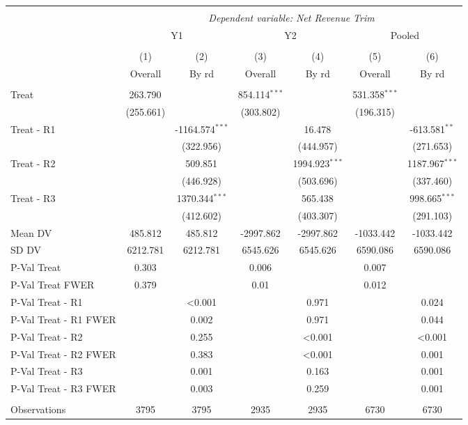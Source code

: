 \begin{tabular}{@{\extracolsep{5pt}}lcccccc}
\\[-1.8ex]\hline
\hline \\[-1.8ex]
& \multicolumn{6}{c}{\textit{Dependent variable: Net Revenue Trim}} \
\cr \cline{2-7}
\\[-1.8ex] & \multicolumn{2}{c}{Y1} & \multicolumn{2}{c}{Y2} & \multicolumn{2}{c}{Pooled}  \\
\\[-1.8ex] & (1) & (2) & (3) & (4) & (5) & (6) 
 \\ & Overall & By rd & Overall & By rd & Overall & By rd \\
\hline \\[-1.8ex]
 Treat & 263.790$^{}$ & & 854.114$^{***}$ & & 531.358$^{***}$ & \\
& (255.661) & & (303.802) & & (196.315) & \\
 Treat - R1 & & -1164.574$^{***}$ & & 16.478$^{}$ & & -613.581$^{**}$ \\
& & (322.956) & & (444.957) & & (271.653) \\
 Treat - R2 & & 509.851$^{}$ & & 1994.923$^{***}$ & & 1187.967$^{***}$ \\
& & (446.928) & & (503.696) & & (337.460) \\
 Treat - R3 & & 1370.344$^{***}$ & & 565.438$^{}$ & & 998.665$^{***}$ \\
& & (412.602) & & (403.307) & & (291.103) \\
 Mean DV & 485.812 & 485.812 & -2997.862 & -2997.862 & -1033.442 & -1033.442 \\
 SD DV & 6212.781 & 6212.781 & 6545.626 & 6545.626 & 6590.086 & 6590.086 \\
 P-Val Treat & 0.303 &  & 0.006 &  & 0.007 &  \\
 P-Val Treat FWER & 0.379 &  & 0.01 &  & 0.012 &  \\
 P-Val Treat - R1 &  & <0.001 &  & 0.971 &  & 0.024 \\
 P-Val Treat - R1 FWER &  & 0.002 &  & 0.971 &  & 0.044 \\
 P-Val Treat - R2 &  & 0.255 &  & <0.001 &  & <0.001 \\
 P-Val Treat - R2 FWER &  & 0.383 &  & <0.001 &  & 0.001 \\
 P-Val Treat - R3 &  & 0.001 &  & 0.163 &  & 0.001 \\
 P-Val Treat - R3 FWER &  & 0.003 &  & 0.259 &  & 0.001 \\
\hline \\[-1.8ex]
 Observations & 3795 & 3795 & 2935 & 2935 & 6730 & 6730 \\

\end{tabular}
